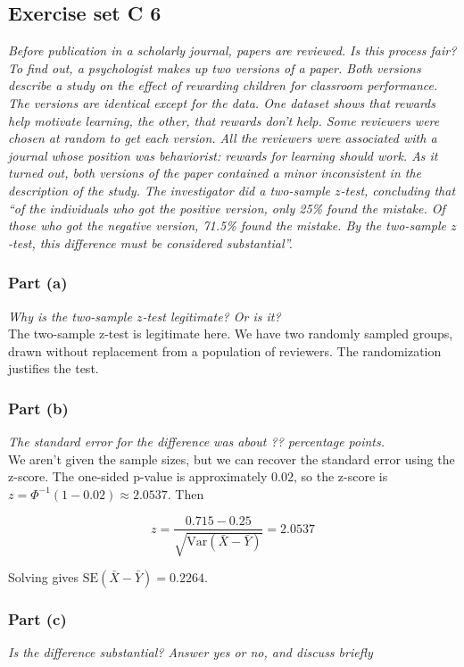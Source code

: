 \documentclass[11pt]{article}
\newcommand{\var}{\textrm{Var}}
\begin{document}
\subsection*{Exercise set C 6} %
\textit{Before publication in a scholarly journal, papers are reviewed. Is this process fair? To find out, a psychologist makes up two versions of a paper. Both versions describe a study on the effect of rewarding children for classroom performance. The versions are identical except for the data. One dataset shows that rewards help motivate learning, the other, that rewards don't help. Some reviewers were chosen at random to get each version. All the reviewers were associated with a journal whose position was behaviorist: rewards for learning should work. As it turned out, both versions of the paper contained a minor inconsistent in the description of the study. The investigator did a two-sample $z$-test, concluding that ``of the individuals who got the positive version, only 25\% found the mistake. Of those who got the negative version, 71.5\% found the mistake. By the two-sample $z$-test, this difference must be considered substantial''.}
\subsubsection*{Part (a)}
\textit{Why is the two-sample $z$-test legitimate? Or is it?}\\

The two-sample z-test is legitimate here.  We have two randomly sampled groups, drawn without replacement from a population of reviewers.  The randomization justifies the test.

\subsubsection*{Part (b)}
\textit{The standard error for the difference was about ?? percentage points.}\\

We aren't given the sample sizes, but we can recover the standard error using the z-score.  The one-sided p-value is approximately $0.02$, so the z-score is $z = \Phi^{-1}(1 - 0.02) \approx 2.0537$.  Then

$$ z = \frac{0.715 - 0.25}{\sqrt{\var(\bar{X} - \bar{Y})}} = 2.0537$$

Solving gives $\text{SE}(\bar{X} - \bar{Y}) = 0.2264$.

\subsubsection*{Part (c)}
\textit{Is the difference substantial? Answer yes or no, and discuss briefly}\\
\end{document}
